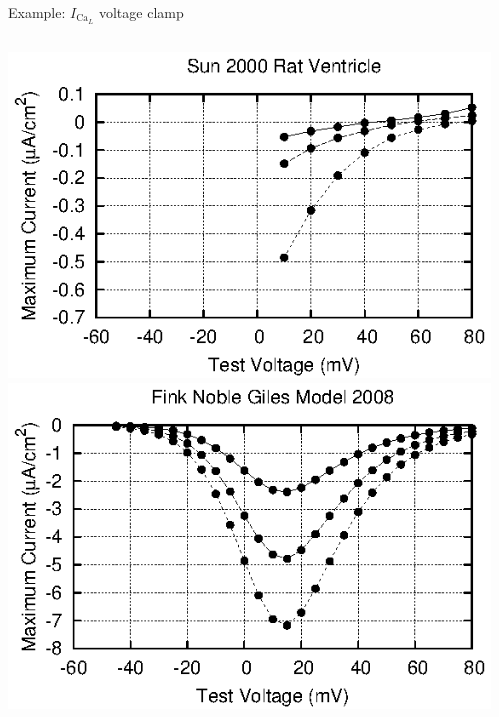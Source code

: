 \documentclass[t,xcolor={usenames,dvipsnames}]{beamer}
\begin{document}
\begin{frame}{Example: $I_{\textrm{Ca}_L}$ voltage clamp}
\begin{columns}[T]
\begin{column}{.33\linewidth}
\begin{center}
\includegraphics[width=\textwidth]{sun_rat_ventricle_ICaL_IV_curve}\\
\vspace{.1cm}
\includegraphics[width=\textwidth]{fink_noble_giles_model_2008_ICaL_IV_curve}
\end{center}
\end{column}
\begin{column}{.33\linewidth}
\begin{center}

\end{center}
\end{column}
\end{columns}
\end{frame}
\end{document}
